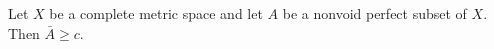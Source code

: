 Let $X$ be a complete metric space and let $A$ be a nonvoid perfect subset of $X$. Then $\bar{A} \geq c$.